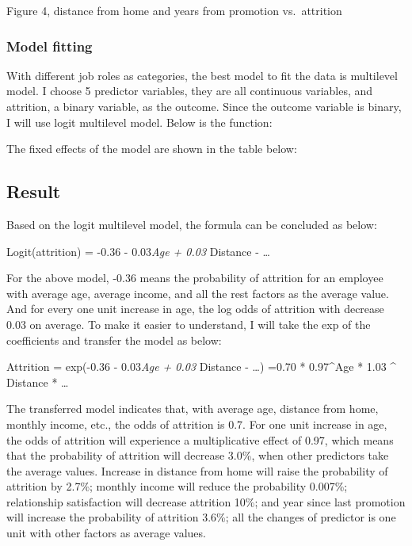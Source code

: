 \documentclass[
]{article}
\begin{document}
Figure 4, distance from home and years from promotion vs.~attrition

\hypertarget{model-fitting}{%
\subsubsection{Model fitting}\label{model-fitting}}

With different job roles as categories, the best model to fit the data
is multilevel model. I choose 5 predictor variables, they are all
continuous variables, and attrition, a binary variable, as the outcome.
Since the outcome variable is binary, I will use logit multilevel model.
Below is the function:

The fixed effects of the model are shown in the table below:

\hypertarget{result}{%
\subsection{Result}\label{result}}

Based on the logit multilevel model, the formula can be concluded as
below:

Logit(attrition) = -0.36 - 0.03\emph{Age + 0.03} Distance - \ldots{}

For the above model, -0.36 means the probability of attrition for an
employee with average age, average income, and all the rest factors as
the average value. And for every one unit increase in age, the log odds
of attrition with decrease 0.03 on average. To make it easier to
understand, I will take the exp of the coefficients and transfer the
model as below:

Attrition = exp(-0.36 - 0.03\emph{Age + 0.03} Distance - \ldots) =0.70 *
0.97\^{}Age * 1.03 \^{} Distance * \ldots{}

The transferred model indicates that, with average age, distance from
home, monthly income, etc., the odds of attrition is 0.7. For one unit
increase in age, the odds of attrition will experience a multiplicative
effect of 0.97, which means that the probability of attrition will
decrease 3.0\%, when other predictors take the average values. Increase
in distance from home will raise the probability of attrition by 2.7\%;
monthly income will reduce the probability 0.007\%; relationship
satisfaction will decrease attrition 10\%; and year since last promotion
will increase the probability of attrition 3.6\%; all the changes of
predictor is one unit with other factors as average values.
\end{document}
